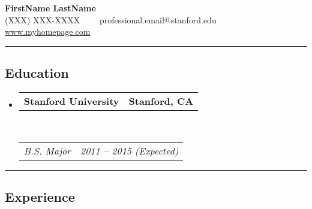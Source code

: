 \documentclass[10pt,letterpaper]{article}
\makeatletter
\newcommand{\headerrow}[2]
{\begin{tabular*}{\linewidth}{l@{\extracolsep{\fill}}r}
	#1 &
	#2 \\
\end{tabular*}}
\makeatother
\begin{document}
\begin{center}

{\LARGE \textbf{FirstName LastName}} \\[0.09cm]
(XXX) XXX-XXXX\ \ \textbullet
\ \ professional.email@stanford.edu \\
\href{http://www.myhomepage.com}{www.myhomepage.com} %
\end{center}

\hrule
\vspace{-0.4em}
\subsection*{Education}
\begin{itemize}
	\parskip=0.1em

	\item 
	\headerrow
		{\textbf{Stanford University}}
		{\textbf{Stanford, CA}}
	\\
	\headerrow
		{\emph{B.S. Major}} 
		{\emph{2011 -- 2015 (Expected)}}
\end{itemize}

\hrule
\vspace{-0.4em}
\subsection*{Experience}
\end{document}
